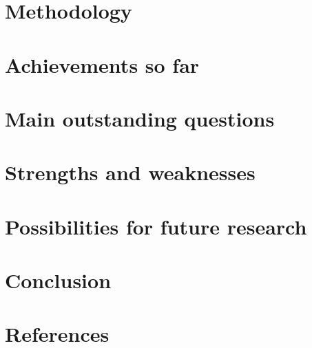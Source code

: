 \documentclass[12pt]{article}
\begin{document}
\section{Methodology}


\section{Achievements so far}
\section{Main outstanding questions}
\section{Strengths and weaknesses}
\section{Possibilities for future research}
\section{Conclusion}

\section{References}

\end{document}
